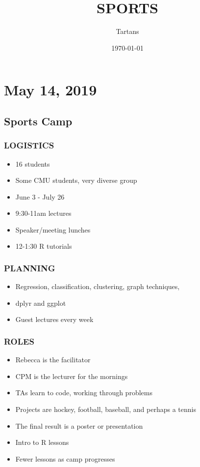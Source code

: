 \documentclass{article}
\author{Tartans}
\date{\today}
\title{SPORTS}
\begin{document}
\maketitle
\tableofcontents


\section{May 14, 2019}
\label{sec:org01bf41e}
\subsection{Sports Camp}
\label{sec:orgb165e96}
\subsubsection{LOGISTICS}
\label{sec:orgd6fb370}
\begin{itemize}
\item 16 students
\item Some CMU students, very diverse group
\item June 3 - July 26
\item 9:30-11am lectures
\item Speaker/meeting lunches
\item 12-1:30 R tutorials
\end{itemize}
\subsubsection{PLANNING}
\label{sec:org461e5f2}
\begin{itemize}
\item Regression, classification, clustering, graph techniques,
\item dplyr and ggplot
\item Guest lectures every week
\end{itemize}
\subsubsection{ROLES}
\label{sec:org53a24cf}
\begin{itemize}
\item Rebecca is the facilitator
\item CPM is the lecturer for the mornings
\item TAs learn to code, working through problems
\item Projects are hockey, football, baseball, and perhaps a tennis
\item The final result is a poster or presentation
\item Intro to R lessons
\item Fewer lessons as camp progresses
\end{itemize}
\end{document}
